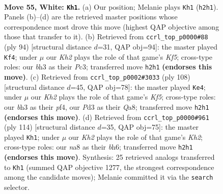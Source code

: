 \documentclass[11pt]{article}
\begin{document}
\clearpage

\begin{figure}[p]\centering
\begin{subfigure}{0.46\textwidth}\centering
\resizebox{\linewidth}{!}{%
\newchessgame
\chessboard[
  setfen={n6Q/8/8/1p4k1/7p/P2P2qb/7K/8 w - - 2 55},
  showmover=false,
  pgfstyle=straightmove, color=movearrow, markmove={h2-h1}
]}
\caption{}
\end{subfigure}\hfill
\begin{subfigure}{0.46\textwidth}\centering
\resizebox{\linewidth}{!}{%
\newchessgame
\chessboard[
  setfen={8/1Q4pk/p5q1/P4K2/8/1PP5/8/8 w - - 3 48},
  showmover=false,
  pgfstyle=straightmove, color=movearrow, markmove={f5-f4}
]}
\caption{}
\end{subfigure}
\\[4pt]
\begin{subfigure}{0.46\textwidth}\centering
\resizebox{\linewidth}{!}{%
\newchessgame
\chessboard[
  setfen={Q3Rbk1/8/7p/1p3Kq1/p4p2/8/P7/8 w - - 0 55},
  showmover=false,
  pgfstyle=straightmove, color=movearrow, markmove={f5-e4}
]}
\caption{}
\end{subfigure}\hfill
\begin{subfigure}{0.46\textwidth}\centering
\resizebox{\linewidth}{!}{%
\newchessgame
\chessboard[
  setfen={7k/2P5/7b/3Pp2Q/1P5p/6q1/6BK/8 w - - 20 58},
  showmover=false,
  pgfstyle=straightmove, color=movearrow, markmove={h2-h1}
]}
\caption{}
\end{subfigure}
\caption{\textbf{Move 55, White: \texttt{Kh1}.} (a) Our position; Melanie plays \texttt{Kh1} (\texttt{h2h1}). Panels (b)--(d) are the retrieved master positions whose correspondence most drove this move (highest QAP objective among those that transfer to it). (b) Retrieved from \texttt{ccrl\_top\_p0000\#88} (ply 94) [structural distance $d$=31, QAP obj=94]: the master played \texttt{Kf4}; under $\mu$ our \emph{Kh2} plays the role of that game's \emph{Kf5}; cross-type roles: our \emph{b}h3 as their \emph{P}c3; transferred move \texttt{h2h1} \textbf{(endorses this move)}. (c) Retrieved from \texttt{ccrl\_top\_p0002\#3033} (ply 108) [structural distance $d$=45, QAP obj=78]: the master played \texttt{Ke4}; under $\mu$ our \emph{Kh2} plays the role of that game's \emph{Kf5}; cross-type roles: our \emph{b}h3 as their \emph{p}f4, our \emph{P}d3 as their \emph{Q}a8; transferred move \texttt{h2h1} \textbf{(endorses this move)}. (d) Retrieved from \texttt{ccrl\_top\_p0000\#961} (ply 114) [structural distance $d$=35, QAP obj=75]: the master played \texttt{Kh1}; under $\mu$ our \emph{Kh2} plays the role of that game's \emph{Kh2}; cross-type roles: our \emph{n}a8 as their \emph{b}h6; transferred move \texttt{h2h1} \textbf{(endorses this move)}. Synthesis: 25 retrieved analogs transferred to \texttt{Kh1} (summed QAP objective 1277, the strongest correspondence among the candidate moves); Melanie committed it via the \texttt{search} selector.}
\label{fig:thought-m108}
\end{figure}
\end{document}

